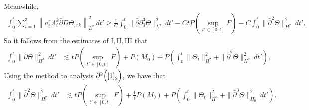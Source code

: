 \documentclass[12pt,a4paper]{amsart}
\numberwithin{equation}{section}
\theoremstyle{plain}
\theoremstyle{definition}
\newcommand{\bpartial}{\bar{\partial}}
\begin{document}
Meanwhile,
\begin{align*}
\int_{0}^{t}\sum\limits_{i=1}^3\left\|a^r_iA^k_i\bpartial D\Theta_{,rk} \right\|_{L^2}^2 \ dt'
\geq  \frac{1}{C}\int_{0}^{t}\|\bpartial\partial_3^3 \Theta\|_{L^2}^2 \ dt'-CtP(\sup\limits_{t'\in[0,t]}F)-C\int_{0}^{t} \|\bpartial^2 \Theta\|_{H^2}^2 \ dt'.
\end{align*}
So it follows from the estimates of $\mathrm{I},\mathrm{II},\mathrm{III}$ that
\begin{equation}
\label{dthetaxxx2}
\begin{aligned}
\int_{0}^{t}\|\bpartial \Theta\|_{H^3}^2 \ dt' &\lesssim tP(\sup\limits_{t'\in[0,t]}F)+P(M_0)+P\left(\int_{0}^{t}\|\Theta_t\|_{H^2}^2 +\|\bpartial^2 \Theta\|_{H^2}^2\ dt'\right),
\end{aligned}
\end{equation}
\vspace{0.3cm}
Using the method to analysis $\bpartial^2  \Big(\eqref{1}_2\Big)$, we have that
\begin{equation}
\label{dthetaxxx1}
\begin{aligned}
\int_{0}^{t}\| \bpartial^2 \Theta\|_{H^2}^2 \ dt' &\lesssim tP(\sup\limits_{t'\in[0,t]}F)+\frac{1}{\epsilon}P(M_0)+P\left(\int_{0}^{t}\|\Theta_t\|_{H^2}^2 +\|\bpartial^3 \Theta\|_{H_0^1}^2\ dt'\right).
\end{aligned}
\end{equation}


\vspace{0.3cm}


\vspace{0.3cm}
\end{document}
